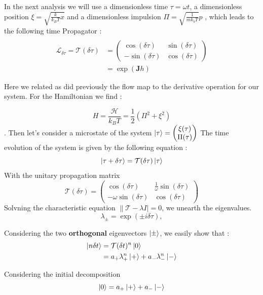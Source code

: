 \documentclass[ansiapaper]{report}
\begin{document}
\begin{multicols}{3}
  In the next analysis we will use a dimensionless time $\tau = \omega t$,  a dimensionless position $\xi = \sqrt{\frac{k}{k_BT}x}$ and a dimensionless impulsion $\Pi = \sqrt{\frac{1}{mk_bT}}p$ , which leads to the following time Propagator :
  \begin{align*}
    \\ \mathcal{L}_{\delta \tau} = \mathcal{T}(\delta \tau) &=  \left(\begin{array}{cc}
        \cos(\delta \tau)   & \sin(\delta \tau) \\
        - \sin(\delta \tau) & \cos(\delta \tau)
      \end{array}
    \right)
    \\ &=  \exp(\textbf{J}h)
  \end{align*}

  Here we related as did previously the flow map to the derivative operation for our system.
  For the Hamiltonian we find :

  $$ H = \frac{\mathcal{H}}{k_BT} = \frac{1}{2}(\Pi^2 + \xi^2)$$. Then let's consider a microstate of the system $\ket{\tau} = \begin{pmatrix}
      \xi(\tau) \\
      \Pi(\tau)
    \end{pmatrix}$
  The time evolution of the system is given by the following equation :
  $$ \ket{\tau + \delta \tau} = \mathcal{T}(\delta \tau) \ket{\tau}$$
  With the unitary propagation matrix $$\mathcal{T}(\delta \tau) = \begin{pmatrix}
      \cos(\delta \tau)         & \frac{1}{\omega}\sin(\delta \tau) \\
      -\omega \sin(\delta \tau) & \cos(\delta \tau)
    \end{pmatrix}$$
  Solvning the characteristic equation $\lVert \mathcal{T} - \lambda I\rvert = 0$, we unearth the eigenvalues.
  $$ \lambda_\pm = \exp(\pm i \delta \tau), $$

  Considering the two \textbf{orthogonal}  eigenvectors $\ket{\pm}$, we easily show that :
  \begin{align*}
    \ket{n \delta t} & = \mathcal{T}(\delta t)^n \ket{0}                   \\
                     & = a_+ \lambda_+^n \ket{+} + a_- \lambda_-^n \ket{-} \\
  \end{align*}

  Considering the initial decomposition $$ \ket{0} = a_+ \ket{+} + a_- \ket{-}$$


\end{multicols}
\end{document}
